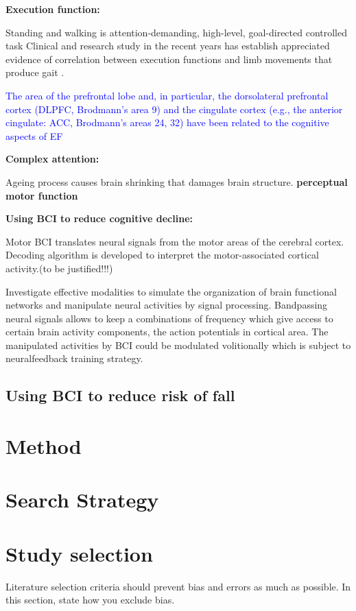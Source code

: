 \documentclass[conference,compsoc]{IEEEtran}
\begin{document}
\textbf{Execution function:}

Standing and walking is attention-demanding, high-level, goal-directed controlled task
Clinical and research study in the recent years has establish appreciated evidence of correlation between execution functions and limb movements that produce gait \cite{Yogev_Seligmann_2007}.


\textcolor{blue}{The area of the prefrontal
lobe and, in particular, the dorsolateral prefrontal cortex
(DLPFC, Brodmann’s area 9) and the cingulate cortex
(e.g., the anterior cingulate: ACC, Brodmann’s areas 24,
32) have been related to the cognitive aspects of EF \cite{Yogev_Seligmann_2007}}

\textbf{Complex attention:}

Ageing process causes brain shrinking that damages brain structure.
\textbf{perceptual motor function}

\textbf{Using BCI to reduce cognitive decline:}

Motor BCI translates neural signals from the motor areas of the cerebral cortex. Decoding algorithm is developed to interpret the motor-associated cortical activity.(to be justified!!!)

Investigate effective modalities to simulate the organization 
of brain functional networks and manipulate neural activities by signal processing. Bandpassing neural signals allows to keep a combinations of frequency which give access to certain brain activity components, the action potentials in cortical area. The manipulated activities by BCI 
could be modulated volitionally which is subject to neuralfeedback training strategy.

\subsection{Using BCI to reduce risk of fall}

\section{Method}
\section{Search Strategy}
\section{Study selection}
Literature selection criteria should prevent bias and errors as much as possible. In this section, state how you exclude bias.
\end{document}
